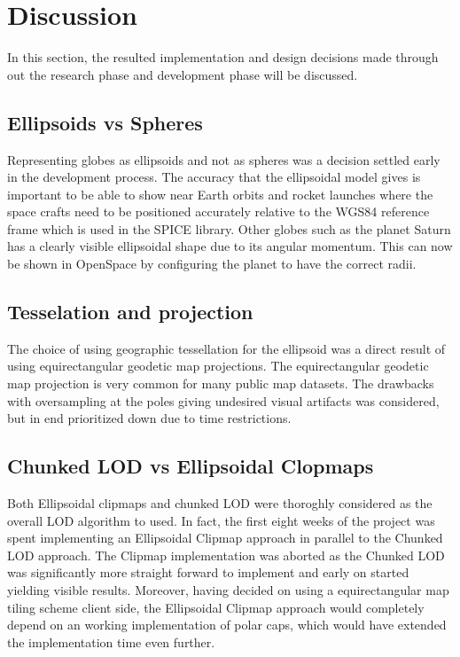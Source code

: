 \chapter{Discussion}
In this section, the resulted implementation and design decisions made through out the research phase and development phase will be discussed. 

\section{Ellipsoids vs Spheres}
Representing globes as ellipsoids and not as spheres was a decision settled early in the development process. 
The accuracy that the ellipsoidal model gives is important to be able to show near Earth orbits and rocket launches where the space crafts need to be positioned accurately relative to the WGS84 reference frame which is used in the SPICE library. 
Other globes such as the planet Saturn has a clearly visible ellipsoidal shape due to its angular momentum. This can now be shown in OpenSpace by configuring the planet to have the correct radii.

\section{Tesselation and projection}
The choice of using geographic tessellation for the ellipsoid was a direct result of using equirectangular geodetic map projections. 
The equirectangular geodetic map projection is very common for many public map datasets. 
The drawbacks with oversampling at the poles giving undesired visual artifacts was considered, but in end prioritized down due to time restrictions. 

\section{Chunked LOD vs Ellipsoidal Clopmaps}
Both Ellipsoidal clipmaps and chunked LOD were thoroghly considered as the overall LOD algorithm to used. 
In fact, the first eight weeks of the project was spent implementing an Ellipsoidal Clipmap approach in parallel to the Chunked LOD approach. 
The Clipmap implementation was aborted as the Chunked LOD was significantly more straight forward to implement and early on started yielding visible results. 
Moreover, having decided on using a equirectangular map tiling scheme client side, the Ellipsoidal Clipmap approach would completely depend on an working implementation of polar caps, which would have extended the implementation time even further.

